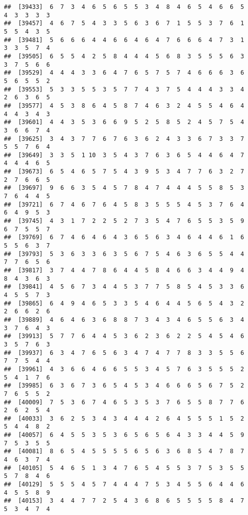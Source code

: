 \documentclass[
]{book}
\begin{document}
\begin{verbatim}
##  [39433]  6  7  3  4  6  5  6  5  5  3  4  8  4  6  5  4  6  6  5  4  3  3  3  3
##  [39457]  4  6  7  5  4  3  3  5  6  3  6  7  1  5  5  3  7  6  1  5  5  4  3  5
##  [39481]  5  6  6  6  4  4  6  6  4  6  4  7  6  6  6  4  7  3  1  3  3  5  7  4
##  [39505]  6  5  5  4  2  5  8  4  4  4  5  6  8  3  5  5  5  6  3  3  7  5  6  6
##  [39529]  4  4  4  3  3  6  4  7  6  5  7  5  7  4  6  6  6  3  6  5  6  5  5  2
##  [39553]  5  3  3  5  5  3  5  7  7  4  3  7  5  4  4  4  3  3  4  2  6  3  6  5
##  [39577]  4  5  3  8  6  4  5  8  7  4  6  3  2  4  5  5  4  6  4  4  4  3  4  3
##  [39601]  4  4  3  5  3  6  6  9  5  2  5  8  5  2  4  5  7  5  4  3  6  6  7  4
##  [39625]  3  4  3  7  7  6  7  6  3  6  2  4  3  3  6  7  3  3  7  5  5  7  6  4
##  [39649]  3  3  5  1 10  3  5  4  3  7  6  3  6  5  4  4  6  4  7  4  4  4  6  5
##  [39673]  6  5  4  6  5  7  5  4  3  9  5  3  4  7  7  6  3  2  7  2  7  6  6  5
##  [39697]  9  6  6  3  5  4  5  7  8  4  7  4  4  4  5  5  8  5  3  7  6  4  4  5
##  [39721]  6  7  4  6  7  6  4  5  8  3  5  5  5  4  5  3  7  6  4  6  4  9  5  3
##  [39745]  4  3  1  7  2  2  5  2  7  3  5  4  7  6  5  5  3  5  9  6  7  5  5  7
##  [39769]  6  7  4  6  4  6  4  3  6  5  6  3  4  6  4  4  6  1  6  5  5  6  3  7
##  [39793]  5  3  6  3  3  6  3  5  6  7  5  4  6  3  6  5  5  4  4  7  7  6  5  6
##  [39817]  3  7  4  4  7  8  6  4  4  5  8  4  6  6  3  4  4  9  4  8  4  3  6  3
##  [39841]  4  5  6  7  3  4  4  5  3  7  7  5  8  5  4  5  3  3  6  4  5  5  7  3
##  [39865]  6  4  9  4  6  5  3  3  5  4  6  4  4  5  6  5  4  3  2  2  6  6  2  6
##  [39889]  4  6  4  6  3  6  8  8  7  3  4  3  4  6  5  5  6  3  4  3  7  6  4  3
##  [39913]  5  7  7  6  4  4  5  3  6  2  3  6  2  2  5  4  5  4  6  3  5  7  6  3
##  [39937]  6  3  4  7  6  5  6  3  4  7  4  7  7  8  3  3  5  5  6  7  7  5  4  4
##  [39961]  4  3  6  6  4  6  6  5  5  3  4  5  7  6  3  5  5  5  2  5  4  1  7  6
##  [39985]  6  3  6  7  3  6  5  4  5  3  4  6  6  6  5  6  7  5  2  7  6  5  5  2
##  [40009]  7  5  3  6  7  4  6  5  3  5  3  7  6  5  5  8  7  7  6  2  6  2  5  4
##  [40033]  3  6  2  5  3  4  3  4  4  4  2  6  4  5  5  5  1  5  2  5  4  4  8  2
##  [40057]  6  4  5  5  3  5  3  6  5  6  5  6  4  3  3  4  4  5  9  7  5  3  5  5
##  [40081]  8  6  5  4  5  5  5  5  6  5  6  3  6  8  5  4  7  8  7  4  6  3  7  4
##  [40105]  5  4  6  5  1  3  4  7  6  5  4  5  5  3  7  5  3  5  5  5  7  8  4  6
##  [40129]  5  5  5  4  5  7  4  4  4  7  5  3  4  5  5  6  4  4  6  4  5  5  8  9
##  [40153]  3  4  4  7  7  2  5  4  3  6  8  6  5  5  5  5  8  4  7  5  3  4  7  4

\end{verbatim}
\end{document}
